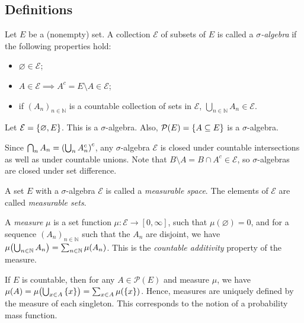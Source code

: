 \subsection{Definitions}
\begin{definition}
	Let \( E \) be a (nonempty) set. A collection \( \mathcal E \) of subsets of \( E \) is called a \emph{\( \sigma \)-algebra} if the following properties hold:
	\begin{itemize}
		\item \( \varnothing \in \mathcal E \);
		\item \( A \in \mathcal E \implies A^c = E \setminus A \in \mathcal E \);
		\item if \( (A_n)_{n \in \mathbb N} \) is a countable collection of sets in \( \mathcal E \), \( \bigcup_{n \in \mathbb N} A_n \in \mathcal E \).
	\end{itemize}
\end{definition}
\begin{example}
	Let \( \mathcal E = \qty{\varnothing, E} \).
	This is a \( \sigma \)-algebra.
	Also, \( \mathcal P(E) = \qty{A \subseteq E} \) is a \( \sigma \)-algebra.
\end{example}
\begin{remark}
	Since \( \bigcap_n A_n = \qty(\bigcup_n A_n^c)^c \), any \( \sigma \)-algebra \( \mathcal E \) is closed under countable intersections as well as under countable unions.
	Note that \( B \setminus A = B \cap A^c \in \mathcal E \), so \( \sigma \)-algebras are closed under set difference.
\end{remark}
\begin{definition}
	A set \( E \) with a \( \sigma \)-algebra \( \mathcal E \) is called a \emph{measurable space}.
	The elements of \( \mathcal E \) are called \emph{measurable sets}.
\end{definition}
\begin{definition}
	A \emph{measure} \( \mu \) is a set function \( \mu : \mathcal E \to [0,\infty] \), such that \( \mu(\varnothing) = 0 \), and for a sequence \( (A_n)_{n \in \mathbb N} \) such that the \( A_n \) are disjoint, we have \( \mu\qty(\bigcup_{n \in \mathbb N} A_n) = \sum_{n \in \mathbb N} \mu(A_n) \).
	This is the \emph{countable additivity} property of the measure.
\end{definition}
\begin{remark}
	If \( E \) is countable, then for any \( A \in \mathcal P(E) \) and measure \( \mu \), we have \( \mu(A) = \mu\qty(\bigcup_{x\in A} \qty{x}) = \sum_{x \in A} \mu(\qty{x}) \).
	Hence, measures are uniquely defined by the measure of each singleton.
	This corresponds to the notion of a probability mass function.
\end{remark}
